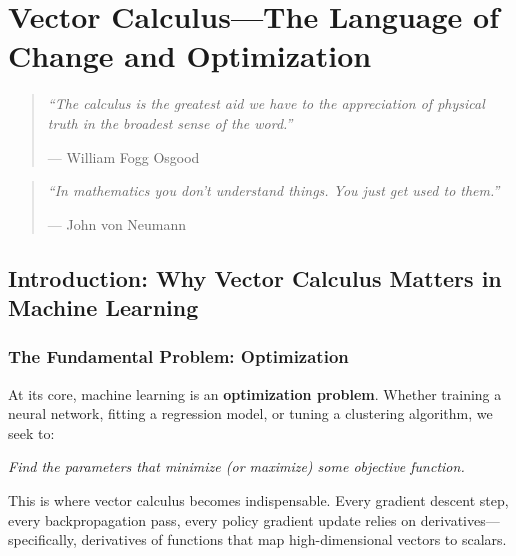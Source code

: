 \chapter{Vector Calculus---The Language of Change and Optimization}

\begin{quote}
    \itshape
    ``The calculus is the greatest aid we have to the appreciation of physical truth in the broadest sense of the word.''
    
    \raggedleft--- William Fogg Osgood
\end{quote}

\begin{quote}
    \itshape
    ``In mathematics you don't understand things. You just get used to them.''
    
    \raggedleft--- John von Neumann
\end{quote}

\section{Introduction: Why Vector Calculus Matters in Machine Learning}

\subsection{The Fundamental Problem: Optimization}

At its core, machine learning is an \textbf{optimization problem}. Whether training a neural network, fitting a regression model, or tuning a clustering algorithm, we seek to:

\begin{center}
\itshape
Find the parameters that minimize (or maximize) some objective function.
\end{center}

This is where vector calculus becomes indispensable. Every gradient descent step, every backpropagation pass, every policy gradient update relies on derivatives---specifically, derivatives of functions that map high-dimensional vectors to scalars.

